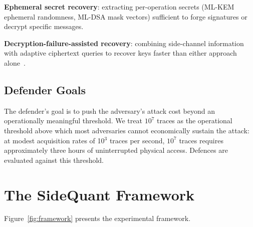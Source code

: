 \documentclass[sigconf,nonacm]{acmart}
\begin{document}
\textbf{Ephemeral secret recovery}: extracting per-operation secrets
(ML-KEM ephemeral randomness, ML-DSA mask vectors) sufficient to
forge signatures or decrypt specific messages.

\textbf{Decryption-failure-assisted recovery}: combining side-channel
information with adaptive ciphertext queries to recover keys
faster than either approach alone~\cite{ngo2024decryption}.

\subsection{Defender Goals}

The defender's goal is to push the adversary's attack cost beyond an
operationally meaningful threshold. We treat $10^7$ traces as the
operational threshold above which most adversaries cannot economically
sustain the attack: at modest acquisition rates of 10$^3$ traces per
second, $10^7$ traces requires approximately three hours of
uninterrupted physical access. Defences are evaluated against this
threshold.

\section{The SideQuant Framework}

Figure~\ref{fig:framework} presents the experimental framework.
\end{document}
